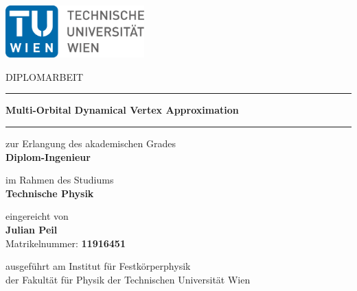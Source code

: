 \begin{titlepage}
    \includegraphics[width=0.4\textwidth]{Graphics/logo_tu.pdf}
    \begin{center}
        \vspace{1.5cm}

        {\large DIPLOMARBEIT}

        \vspace{1em}

		\rule{\linewidth}{0.5pt}
		
		\vspace{0.5cm}
		
        {\Huge \textbf{Multi-Orbital Dynamical Vertex Approximation}}
        
		\vspace{0.15cm}
		
		\rule{\linewidth}{0.5pt}
		
        \vspace{2em}

        \begin{large}
            zur Erlangung des akademischen Grades\\
            \textbf{Diplom-Ingenieur}

            \vspace{1em}

            im Rahmen des Studiums\\
            \textbf{Technische Physik}

            \vspace{1em}

            eingereicht von\\
            \textbf{Julian Peil}\\
            Matrikelnummer: \textbf{11916451}\\
        \end{large}
    \end{center}

    \vspace{4em}

    \noindent ausgeführt am Institut für Festkörperphysik\\
    der Fakultät für Physik der Technischen Universität Wien

    \vspace{1em}


\end{titlepage}
